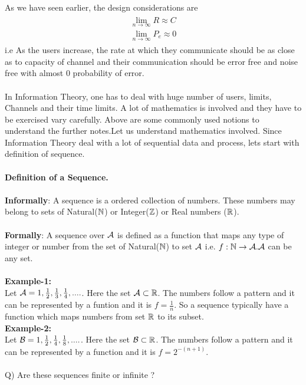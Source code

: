 \documentclass[a4paper]{article}
\begin{document}
As we have seen earlier, the design considerations are
\begin{align}
\begin{split}
\lim_{n \to \infty} R \approx C
\\
\lim_{n \to \infty} P_e \approx 0
\end{split}
\end{align}
i.e As the users increase, the rate at which they communicate should be as close as to capacity of channel and their communication should be error free and noise free with almost 0 probability of error.\\
\\
In Information Theory, one has to deal with huge number of users, limits, Channels and their time limits. A lot of mathematics is involved and they have to be exercised vary carefully. Above are some commonly used notions to understand the further notes.Let us understand mathematics involved. Since Information Theory deal with a lot of sequential data and process, lets start with definition of sequence.
\\
\\
\textbf{Definition of a Sequence.}
\\
\\
\textbf{Informally}: A sequence is a ordered collection of numbers. These numbers may belong to sets of Natural($\mathbb N$) or Integer($\mathbb Z$) or Real numbers ($\mathbb R$).\\
\\
\textbf{Formally}: A sequence over $\mathcal A$ is defined as a function that maps any type of integer or number from the set of Natural($\mathbb N$) to set $\mathcal A$ i.e. $f:\mathbb N \to \mathcal A. \mathcal A$ can be any set. \\
\\
\textbf{Example-1:}
\\
Let $\mathcal A = {1,\frac{1}{2},\frac{1}{3},\frac{1}{4},....}$.
Here the set $\mathcal A \subset \mathbb R$. The numbers follow a pattern and it can be represented by a funtion and it is $f = \frac{1}{n}$. So a sequence typically have a function which maps numbers from set $\mathbb R$ to its subset.\\
\textbf{Example-2:}
\\
Let $\mathcal B = {1,\frac{1}{2},\frac{1}{4},\frac{1}{8},....}$.
Here the set $\mathcal B \subset \mathbb R$. The numbers follow a pattern and it can be represented by a function and it is $f = 2^{-(n+1)}$. 
\\
\\
Q) Are these sequences finite or infinite ?
\\
\end{document}
